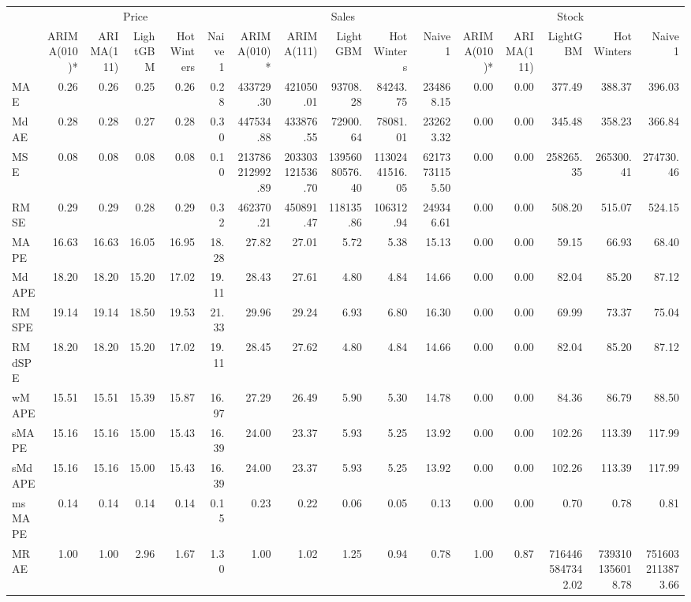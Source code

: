 \begin{tabular}{l|rrrrr|rrrrr|rrrrr}
\toprule
 & \multicolumn{5}{c}{Price} & \multicolumn{5}{c}{Sales} & \multicolumn{5}{c}{Stock} \\
 & ARIMA(010)* & ARIMA(111) & LightGBM & Hot Winters & Naive 1 & ARIMA(010)* & ARIMA(111) & LightGBM & Hot Winters & Naive 1 & ARIMA(010)* & ARIMA(111) & LightGBM & Hot Winters & Naive 1 \\
\midrule
MAE & 0.26 & 0.26 & 0.25 & 0.26 & 0.28 & 433729.30 & 421050.01 & 93708.28 & 84243.75 & 234868.15 & 0.00 & 0.00 & 377.49 & 388.37 & 396.03 \\
MdAE & 0.28 & 0.28 & 0.27 & 0.28 & 0.30 & 447534.88 & 433876.55 & 72900.64 & 78081.01 & 232623.32 & 0.00 & 0.00 & 345.48 & 358.23 & 366.84 \\
MSE & 0.08 & 0.08 & 0.08 & 0.08 & 0.10 & 213786212992.89 & 203303121536.70 & 13956080576.40 & 11302441516.05 & 62173731155.50 & 0.00 & 0.00 & 258265.35 & 265300.41 & 274730.46 \\
RMSE & 0.29 & 0.29 & 0.28 & 0.29 & 0.32 & 462370.21 & 450891.47 & 118135.86 & 106312.94 & 249346.61 & 0.00 & 0.00 & 508.20 & 515.07 & 524.15 \\
MAPE & 16.63 & 16.63 & 16.05 & 16.95 & 18.28 & 27.82 & 27.01 & 5.72 & 5.38 & 15.13 & 0.00 & 0.00 & 59.15 & 66.93 & 68.40 \\
MdAPE & 18.20 & 18.20 & 15.20 & 17.02 & 19.11 & 28.43 & 27.61 & 4.80 & 4.84 & 14.66 & 0.00 & 0.00 & 82.04 & 85.20 & 87.12 \\
RMSPE & 19.14 & 19.14 & 18.50 & 19.53 & 21.33 & 29.96 & 29.24 & 6.93 & 6.80 & 16.30 & 0.00 & 0.00 & 69.99 & 73.37 & 75.04 \\
RMdSPE & 18.20 & 18.20 & 15.20 & 17.02 & 19.11 & 28.45 & 27.62 & 4.80 & 4.84 & 14.66 & 0.00 & 0.00 & 82.04 & 85.20 & 87.12 \\
wMAPE & 15.51 & 15.51 & 15.39 & 15.87 & 16.97 & 27.29 & 26.49 & 5.90 & 5.30 & 14.78 & 0.00 & 0.00 & 84.36 & 86.79 & 88.50 \\
sMAPE & 15.16 & 15.16 & 15.00 & 15.43 & 16.39 & 24.00 & 23.37 & 5.93 & 5.25 & 13.92 & 0.00 & 0.00 & 102.26 & 113.39 & 117.99 \\
sMdAPE & 15.16 & 15.16 & 15.00 & 15.43 & 16.39 & 24.00 & 23.37 & 5.93 & 5.25 & 13.92 & 0.00 & 0.00 & 102.26 & 113.39 & 117.99 \\
msMAPE & 0.14 & 0.14 & 0.14 & 0.14 & 0.15 & 0.23 & 0.22 & 0.06 & 0.05 & 0.13 & 0.00 & 0.00 & 0.70 & 0.78 & 0.81 \\
MRAE & 1.00 & 1.00 & 2.96 & 1.67 & 1.30 & 1.00 & 1.02 & 1.25 & 0.94 & 0.78 & 1.00 & 0.87 & 7164465847342.02 & 7393101356018.78 & 7516032113873.66 \\

\end{tabular}
